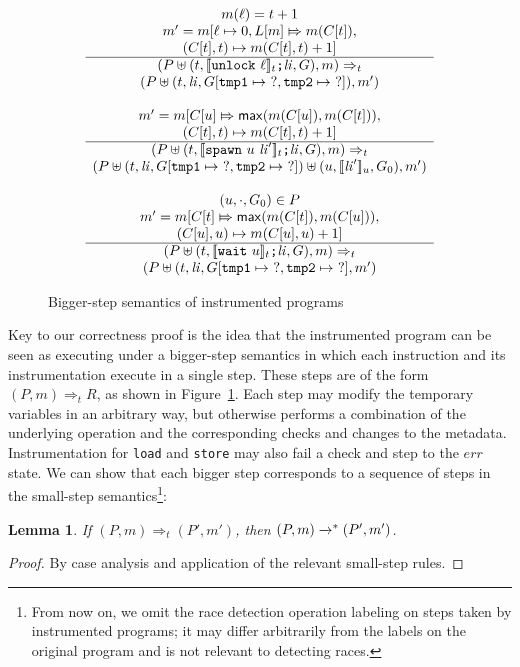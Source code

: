 \documentclass[preprint, 9pt]{sigplanconf}
\newcommand{\meanl}{\ensuremath{[ \! [}}
\newcommand{\meanr}{\ensuremath{] \! ]}}
\newcommand{\means}[1]{\ensuremath{\meanl #1 \meanr}}
\newcommand{\unlock}[1]{\texttt{unlock}\ #1}
\newcommand{\spawn}[2]{\texttt{spawn}\ #1\ #2}
\newcommand{\wait}[1]{\texttt{wait}\ #1}
\newcommand{\instr}[2]{\ensuremath{\means{#2}_{#1}}}
\newcommand{\cfg}[2]{\ensuremath{(#1, #2)}}
\newcommand{\execstar}[4]{\ensuremath{\cfg{#1}{#2} \tto{#3} #4}}
\newcommand{\iexec}[4]{\ensuremath{\cfg{#1}{#2} \Rightarrow_{#3} #4}}
\newcommand{\tto}[1]{\mathrel{
  \vphantom{\xrightarrow{#1}}
  \smash{\xrightarrow{#1}}
  \vphantom{\to}^{*}}
}
\newtheorem{lemma}{Lemma}
\begin{document}
\begin{figure}[t!]
\[\begin{array}{c}
\multicolumn{1}{c}{m(\ell) = t + 1}
\\
\multicolumn{1}{c}{m' = m[\ell \mapsto 0, L[m] \Mapsto m(C[t]),}
\\
\multicolumn{1}{c}{(C[t], t) \mapsto m(C[t], t) + 1]}
\\
\hline
\cfg{P \uplus (t, \instr{t}{\unlock{\ell}}\texttt{;} \mathit{li}, G)}{m}
\Rightarrow_{t} \\
\cfg{P \uplus (t, \mathit{li}, G[\texttt{tmp1} \mapsto\ ?, \texttt{tmp2} \mapsto\ ?])}{m'}
\\\\

\multicolumn{1}{c}{m' = m[C[u] \Mapsto \mathsf{max}(m(C[u]), m(C[t])),} 
\\
\multicolumn{1}{c}{ (C[t], t) \mapsto m(C[t], t) + 1]}
\\
\hline
\cfg{P \uplus (t, \instr{t}{\spawn{u}{\mathit{li}'}}\texttt{;} \mathit{li}, G)}{m}
\Rightarrow_{t} \\
\cfg{P \uplus (t, \mathit{li}, G[\texttt{tmp1} \mapsto\ ?, \texttt{tmp2} \mapsto\ ?]) \uplus (u, \instr{u}{\mathit{li}'}, G_0)}{m'}
\\\\

\multicolumn{1}{c}{(u, \cdot, G_0) \in P}
\\
\multicolumn{1}{c}{m' = m[C[t] \Mapsto \mathsf{max}(m(C[t]), m(C[u])),} 
\\
\multicolumn{1}{c}{(C[u], u) \mapsto m(C[u], u) + 1]}\\
\hline
\cfg{P \uplus (t, \instr{t}{\wait{u}}\texttt{;} \mathit{li}, G)}{m}
\Rightarrow_{t} \\
\cfg{P \uplus (t, \mathit{li}, G[\texttt{tmp1} \mapsto\ ?, \texttt{tmp2} \mapsto\ ?]}{m'}

\end{array}
\]
\caption{Bigger-step semantics of instrumented programs}
\label{iexec}
\end{figure}
Key to our correctness proof is the idea that the instrumented program can be seen as executing under a bigger-step semantics in which each instruction and its instrumentation execute in a single step. These steps are of the form $\iexec{P}{m}{t}{R}$, as shown in Figure~\ref{iexec}. Each step may modify the temporary variables in an arbitrary way, but otherwise performs a combination of the underlying operation and the corresponding checks and changes to the metadata. Instrumentation for \texttt{load} and \texttt{store} may also fail a check and step to the $\mathit{err}$ state. We can show that each bigger step corresponds to a sequence of steps in the small-step semantics\footnote{From now on, we omit the race detection operation labeling on steps taken by instrumented programs; it may differ arbitrarily from the labels on the original program and is not relevant to detecting races.}:
\begin{lemma}\label{iexec-exec}If $\iexec{P}{m}{t}{(P', m')}$, then $\execstar{P}{m}{}{(P', m')}$.\end{lemma}
\begin{proof}By case analysis and application of the relevant small-step rules.\end{proof}
\end{document}
